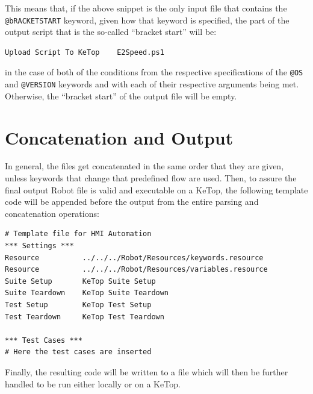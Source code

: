 This means that, if the above snippet is the only input file that contains the \verb|@bRACKETSTART| keyword, given how that keyword is specified, the part of the output script that is the so-called ``bracket start'' will be:

\begin{lstlisting}
Upload Script To KeTop    E2Speed.ps1
\end{lstlisting}

in the case of both of the conditions from the respective specifications of the \verb|@OS| and \verb|@VERSION| keywords and with each of their respective arguments being met. Otherwise, the ``bracket start'' of the output file will be empty. 

\section{Concatenation and Output}

In general, the files get concatenated in the same order that they are given, unless keywords that change that predefined flow are used. Then, to assure the final output Robot file is valid and executable on a KeTop, the following template code will be appended before the output from the entire parsing and concatenation operations:

\begin{lstlisting}
# Template file for HMI Automation
*** Settings ***
Resource          ../../../Robot/Resources/keywords.resource
Resource          ../../../Robot/Resources/variables.resource
Suite Setup       KeTop Suite Setup
Suite Teardown    KeTop Suite Teardown
Test Setup        KeTop Test Setup
Test Teardown     KeTop Test Teardown

*** Test Cases ***
# Here the test cases are inserted
\end{lstlisting}

Finally, the resulting code will be written to a file which will then be further handled to be run either locally or on a KeTop. 